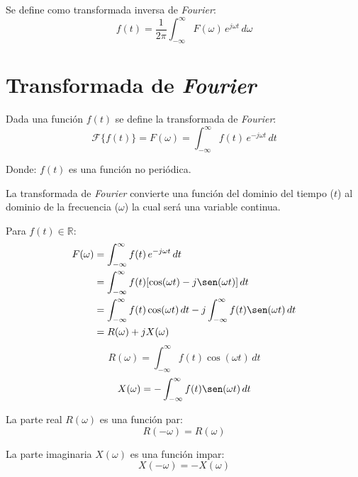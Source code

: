 Se define como transformada inversa de \emph{Fourier}:
\begin{equation}
    f(t)=\frac{1}{2\pi}\int_{-\infty}^\infty F(\omega)\,e^{j\omega t}\,d\omega
\end{equation}

\section{Transformada de \emph{Fourier}}
Dada una función $f(t)$ se define la transformada de \emph{Fourier}:
\begin{equation}
    \mathcal{F}\{f(t)\}=F(\omega)
        =\int_{-\infty}^{\infty} f(t)\,e^{-j\omega t}\,dt
\end{equation}

Donde: $f(t)$ es una función no periódica.

La transformada de \emph{Fourier} convierte una función del dominio del tiempo
($t$) al dominio de la frecuencia ($\omega$) la cual será una variable continua.

Para $f(t)\in\mathbb{R}$:
\begin{equation*}
\begin{split}
    F(\omega)
        &=\int_{-\infty}^{\infty} f(t)\,e^{-j\omega t}\,dt\\
        &=\int_{-\infty}^{\infty} f(t)[\cos(\omega t)-j\sen(\omega t)]\,dt\\
        &=\int_{-\infty}^{\infty} f(t)\cos(\omega t)\,dt
            -j\int_{-\infty}^{\infty} f(t)\sen(\omega t)\,dt\\
        &=R(\omega)+jX(\omega)\\
\end{split}
\end{equation*}
\begin{equation*}
    R(\omega)=\int_{-\infty}^{\infty} f(t)\cos(\omega t)\,dt
\end{equation*}
\begin{equation*}
    X(\omega)=-\int_{-\infty}^{\infty} f(t)\sen(\omega t)\,dt\\
\end{equation*}

La parte real $R(\omega)$ es una función par:
\begin{equation*}
    R(-\omega)=R(\omega)
\end{equation*}

La parte imaginaria $X(\omega)$ es una función impar:
\begin{equation*}
    X(-\omega)=-X(\omega)
\end{equation*}


